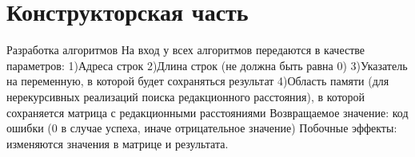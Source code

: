 
\section{Конструкторская часть}
\newpage

Разработка алгоритмов
На вход у всех алгоритмов передаются в качестве параметров:
1)Адреса строк
2)Длина строк (не должна быть равна 0)
3)Указатель на переменную, в которой будет сохраняться результат
4)Область памяти (для нерекурсивных реализаций поиска редакционного расстояния), в которой
сохраняется матрица с редакционными расстояниями
Возвращаемое значение: код ошибки (0 в случае успеха, иначе отрицательное значение)
Побочные эффекты: изменяются значения в матрице и результата.


